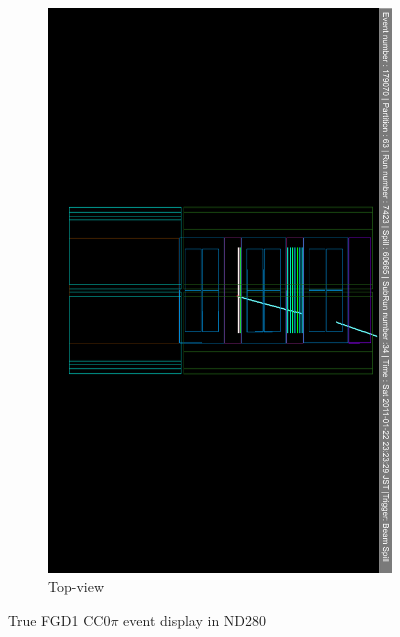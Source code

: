 \begin{itemize}
\begin{figure}[htbp]
\begin{subfigure}[t]{0.49\textwidth}
		\includegraphics[width=\textwidth, trim={1cm 15cm 1cm 15cm}, clip]{figures/numu/evtdisplay/CC0pi_7423_34_179070_ortX0Z_all}
	\caption{Top-view}
	\end{subfigure}
	\caption{True FGD1 CC0$\pi$ event display in ND280}
	\label{fig:cc0pi_evtdisplay}
\end{figure}


\end{itemize}
